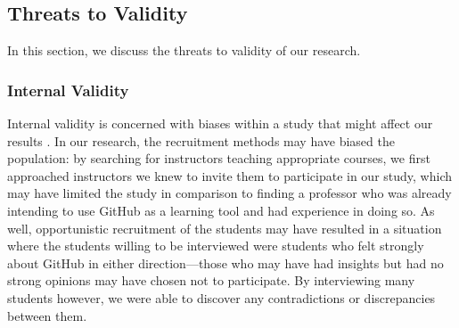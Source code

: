 %

\subsection{Threats to Validity}
In this section, we discuss the threats to validity of our research.

\subsubsection{Internal Validity}
Internal validity is concerned with biases within a study that might affect our results \cite{creswell2013research}. In our research, the recruitment methods may have biased the population: by searching for instructors teaching appropriate courses, we first approached instructors we knew to invite them to participate in our study, which may have limited the study in comparison to finding a professor who was already intending to use GitHub as a learning tool and had experience in doing so. As well, opportunistic recruitment of the students may have resulted in a situation where the students willing to be interviewed were students who felt strongly about GitHub in either direction---those who may have had insights but had no strong opinions may have chosen not to participate. By interviewing many students however, we were able to discover any contradictions or discrepancies between them.

